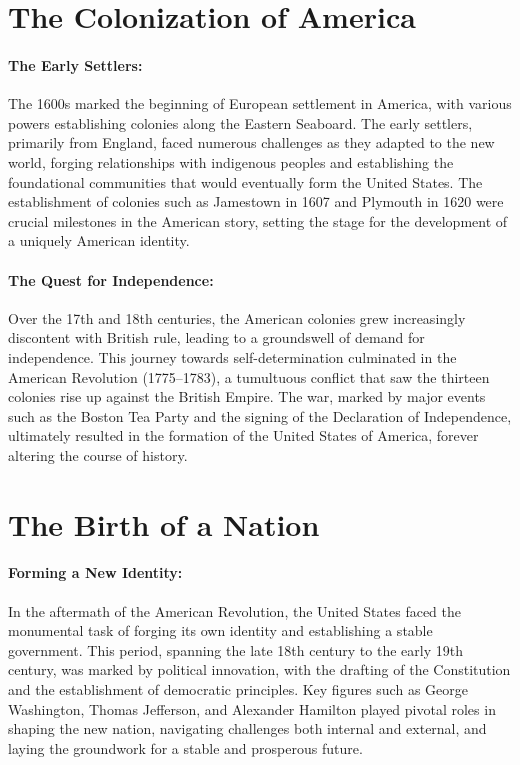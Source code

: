 \documentclass{book}
\begin{document}
\section*{The Colonization of America}

\paragraph{The Early Settlers:}
The 1600s marked the beginning of European settlement in America, with various powers establishing colonies along the Eastern Seaboard. The early settlers, primarily from England, faced numerous challenges as they adapted to the new world, forging relationships with indigenous peoples and establishing the foundational communities that would eventually form the United States. The establishment of colonies such as Jamestown in 1607 and Plymouth in 1620 were crucial milestones in the American story, setting the stage for the development of a uniquely American identity.

\paragraph{The Quest for Independence:}
Over the 17th and 18th centuries, the American colonies grew increasingly discontent with British rule, leading to a groundswell of demand for independence. This journey towards self-determination culminated in the American Revolution (1775–1783), a tumultuous conflict that saw the thirteen colonies rise up against the British Empire. The war, marked by major events such as the Boston Tea Party and the signing of the Declaration of Independence, ultimately resulted in the formation of the United States of America, forever altering the course of history.

\section*{The Birth of a Nation}

\paragraph{Forming a New Identity:}
In the aftermath of the American Revolution, the United States faced the monumental task of forging its own identity and establishing a stable government. This period, spanning the late 18th century to the early 19th century, was marked by political innovation, with the drafting of the Constitution and the establishment of democratic principles. Key figures such as George Washington, Thomas Jefferson, and Alexander Hamilton played pivotal roles in shaping the new nation, navigating challenges both internal and external, and laying the groundwork for a stable and prosperous future.
\end{document}
